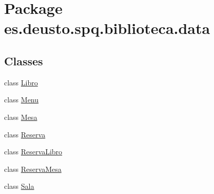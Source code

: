 \hypertarget{namespacees_1_1deusto_1_1spq_1_1biblioteca_1_1data}{}\section{Package es.\+deusto.\+spq.\+biblioteca.\+data}
\label{namespacees_1_1deusto_1_1spq_1_1biblioteca_1_1data}
\subsection*{Classes}
\begin{DoxyCompactItemize}
\item 
class \mbox{\hyperlink{classes_1_1deusto_1_1spq_1_1biblioteca_1_1data_1_1_libro}{Libro}}
\item 
class \mbox{\hyperlink{classes_1_1deusto_1_1spq_1_1biblioteca_1_1data_1_1_menu}{Menu}}
\item 
class \mbox{\hyperlink{classes_1_1deusto_1_1spq_1_1biblioteca_1_1data_1_1_mesa}{Mesa}}
\item 
class \mbox{\hyperlink{classes_1_1deusto_1_1spq_1_1biblioteca_1_1data_1_1_reserva}{Reserva}}
\item 
class \mbox{\hyperlink{classes_1_1deusto_1_1spq_1_1biblioteca_1_1data_1_1_reserva_libro}{Reserva\+Libro}}
\item 
class \mbox{\hyperlink{classes_1_1deusto_1_1spq_1_1biblioteca_1_1data_1_1_reserva_mesa}{Reserva\+Mesa}}
\item 
class \mbox{\hyperlink{classes_1_1deusto_1_1spq_1_1biblioteca_1_1data_1_1_sala}{Sala}}
\end{DoxyCompactItemize}

